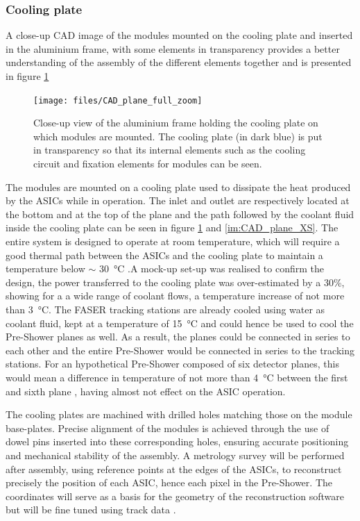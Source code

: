 			\subsubsection{Cooling plate}
			A close-up CAD image of the modules mounted on the cooling plate and inserted in the aluminium frame, with some elements in transparency provides a better understanding of the assembly of the different elements together and is presented in figure \ref{im:CAD_plane_full_zoom}
				\begin{figure}[h]
					\centering
					\texttt{[image: files/CAD\_plane\_full\_zoom]}
					\caption{Close-up view of the aluminium frame holding the cooling plate on which modules are mounted. The cooling plate (in dark blue) is put in transparency so that its internal elements such as the cooling circuit and fixation elements for modules can be seen.}
					\label{im:CAD_plane_full_zoom}
				\end{figure}
			
				The modules are mounted on a cooling plate used to dissipate the heat produced by the ASICs while in operation. The inlet and outlet are respectively located at the bottom and at the top of the plane and the path followed by the coolant fluid inside the cooling plate can be seen in figure \ref{im:CAD_plane_full_zoom} and \ref{im:CAD_plane_XS}. The entire system is designed to operate at room temperature, which will require a good thermal path between the ASICs and the cooling plate to maintain a temperature below $\sim$ \SI{30}{\celsius} \cite{PreShower_TP}.A mock-up set-up was realised to confirm the design, the power transferred to the cooling plate was over-estimated by a 30\%, showing for a a wide range of coolant flows, a temperature increase of not more than \SI{3}{\celsius}. The FASER tracking stations are already cooled using water as coolant fluid, kept at a temperature of \SI{15}{\celsius} and could hence be used to cool the Pre-Shower planes as well. As a result, the planes could be connected in series to each other and the entire Pre-Shower would be connected in series to the tracking stations. For an hypothetical Pre-Shower composed of six detector planes, this would mean a difference in temperature of not more than \SI{4}{\celsius} between the first and sixth plane \cite{PreShower_TP}, having almost not effect on the ASIC operation.
				
				The cooling plates are machined with drilled holes matching those on the module base-plates. Precise alignment of the modules is achieved through the use of dowel pins inserted into these corresponding holes, ensuring accurate positioning and mechanical stability of the assembly. A metrology survey will be performed after assembly, using reference points at the edges of the ASICs, to reconstruct precisely the position of each ASIC, hence each pixel in the Pre-Shower. The coordinates will serve as a basis for the geometry of the reconstruction software but will be fine tuned using track data \cite{PreShower_TP}.
				
